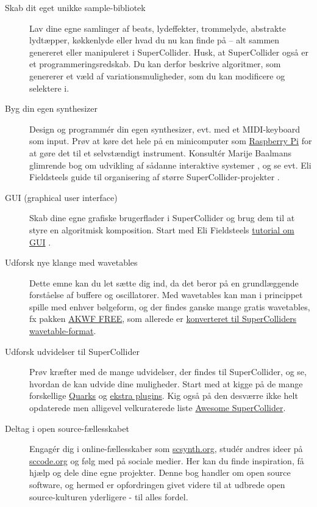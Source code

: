 \begin{description}
\item[Skab dit eget unikke sample-bibliotek] Lav dine egne samlinger af beats, lydeffekter, trommelyde, abstrakte lydtæpper, køkkenlyde eller hvad du nu kan finde på – alt sammen genereret eller manipuleret i SuperCollider. Husk, at SuperCollider også er et programmeringsredskab. Du kan derfor beskrive algoritmer, som genererer et væld af variationsmuligheder, som du kan modificere og selektere i.

\item[Byg din egen synthesizer] Design og programmér din egen synthesizer, evt. med et MIDI-keyboard som input. Prøv at køre det hele på en minicomputer som \href{https://github.com/supercollider/supercollider/blob/develop/README\_RASPBERRY\_PI.md}{Raspberry Pi} for at gøre det til et selvstændigt instrument. Konsultér Marije Baalmans glimrende bog om udvikling af sådanne interaktive systemer \parencite{baalman2022}, og se evt. Eli Fieldsteels guide til organisering af større SuperCollider-projekter \parencite[p. 249]{fieldsteel2024a}.

\item[GUI (graphical user interface)] Skab dine egne grafiske brugerflader i SuperCollider og brug dem til at styre en algoritmisk komposition. Start med Eli Fieldsteels \href{https://www.youtube.com/watch?v=W2D\_PzOVfT0}{tutorial om GUI} \parencite{fieldsteel2015}.

\item[Udforsk nye klange med wavetables] Dette emne kan du let sætte dig ind, da det beror på en grundlæggende forståelse af buffere og oscillatorer. Med wavetables kan man i princippet spille med enhver bølgeform, og der findes ganske mange gratis wavetables, fx pakken \href{https://www.adventurekid.se/akrt/waveforms/adventure-kid-waveforms/}{AKWF FREE}, som allerede er \href{https://github.com/terrymullett/AKWF-SuperCollider}{konverteret til SuperColliders wavetable-format}.

\item[Udforsk udvidelser til SuperCollider] Prøv kræfter med de mange udvidelser, der findes til SuperCollider, og se, hvordan de kan udvide dine muligheder. Start med at kigge på de mange forskellige \href{https://github.com/supercollider-quarks/quarks}{Quarks} og \href{https://supercollider.github.io/sc3-plugins/}{ekstra plugins}. Kig også på den desværre ikke helt opdaterede men alligevel velkuraterede liste \href{https://github.com/madskjeldgaard/awesome-supercollider}{Awesome SuperCollider}.

\item[Deltag i open source-fællesskabet] Engagér dig i online-fællesskaber som \href{https://scsynth.org/}{scsynth.org}, studér andres ideer på \href{http://sccode.org/}{sccode.org} og følg med på sociale medier. Her kan du finde inspiration, få hjælp og dele dine egne projekter. Denne bog handler om open source software, og hermed er opfordringen givet videre til at udbrede open source-kulturen yderligere - til alles fordel.
\end{description}
